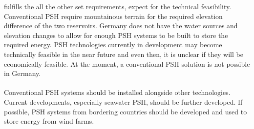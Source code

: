 \begin{parcolumns}[colwidths={1=2.5 cm, 2=10 cm, 3=2.5cm}]{3}
{fulfills the all the other set requirements, expect for the technical feasibility. Conventional PSH require mountainous terrain for the required elevation difference of the two reservoirs. Germany does not have the water sources and elevation changes to allow for enough PSH systems to be built to store the required energy. PSH technologies currently in development may become technically feasible in the near future and even then, it is unclear if they will be economically feasible. At the moment, a conventional PSH solution is not possible in Germany.\\ \\
\noindent
Conventional PSH systems should be installed alongside other technologies. Current developments, especially seawater PSH, should be further developed. If possible, PSH systems from bordering countries should be developed and used to store energy from wind farms.
	}


\end{parcolumns}
